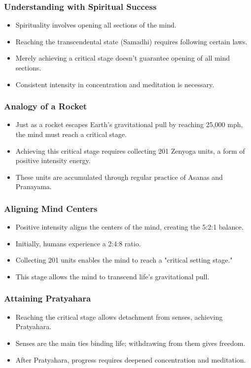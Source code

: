 \begin{frame}[fragile]\frametitle{Understanding with Spiritual Success}
    \begin{itemize}
        \item Spirituality involves opening all sections of the mind.
        \item Reaching the transcendental state (Samadhi) requires following certain laws.
        \item Merely achieving a critical stage doesn't guarantee opening of all mind sections.
        \item Consistent intensity in concentration and meditation is necessary.
    \end{itemize}
\end{frame}

\begin{frame}[fragile]\frametitle{Analogy of a Rocket}
    \begin{itemize}
        \item Just as a rocket escapes Earth’s gravitational pull by reaching 25,000 mph, the mind must reach a critical stage.
        \item Achieving this critical stage requires collecting 201 Zenyoga units, a form of positive intensity energy.
        \item These units are accumulated through regular practice of Asanas and Pranayama.
    \end{itemize}
\end{frame}

\begin{frame}[fragile]\frametitle{Aligning Mind Centers}
    \begin{itemize}
        \item Positive intensity aligns the centers of the mind, creating the 5:2:1 balance.
        \item Initially, humans experience a 2:4:8 ratio.
        \item Collecting 201 units enables the mind to reach a "critical setting stage."
        \item This stage allows the mind to transcend life’s gravitational pull.
    \end{itemize}
\end{frame}

\begin{frame}[fragile]\frametitle{Attaining Pratyahara}
    \begin{itemize}
        \item Reaching the critical stage allows detachment from senses, achieving Pratyahara.
        \item Senses are the main ties binding life; withdrawing from them gives freedom.
        \item After Pratyahara, progress requires deepened concentration and meditation.
    \end{itemize}
\end{frame}


